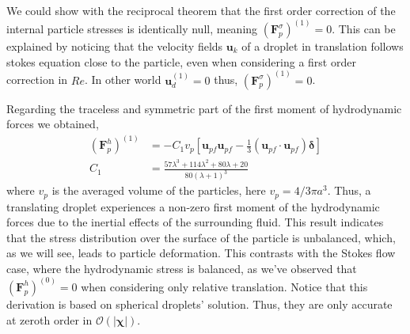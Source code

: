 We could show with the reciprocal theorem that the first order correction of the internal particle stresses is identically null, meaning $(\textbf{F}^\sigma_p)^{(1)} = 0$. 
This can be explained by noticing that the velocity fields $\textbf{u}_k$ of a droplet in translation follows stokes equation close to the particle, even when considering a first order correction in $Re$.
In other world $\textbf{u}^{(1)}_d =0 $ thus,  $(\textbf{F}^\sigma_p)^{(1)} = 0$. 

Regarding the traceless and symmetric part of the first moment of hydrodynamic forces we obtained, 
\begin{align}
    (\textbf{F}^h_p)^{(1)}  
    &=
    - C_1 v_p
    [
        \textbf{u}_{pf}\textbf{u}_{pf} - \frac{1}{3}(\textbf{u}_{pf}\cdot \textbf{u}_{pf})\bm\delta 
    ]\\
    C_1 &=
    \frac{57 \lambda^{3} + 114 \lambda^{2} + 80 \lambda + 20}{80 \left(\lambda + 1\right)^{3}}
    \label{eq:closure_sigma_e}
\end{align}
where $v_p$ is the averaged volume of the particles, here $v_p = 4/3 \pi a^3$.  
Thus, a translating droplet experiences a non-zero first moment of the hydrodynamic forces due to the inertial effects of the surrounding fluid. This result indicates that the stress distribution over the surface of the particle is unbalanced, which, as we will see, leads to particle deformation.
This contrasts with the Stokes flow case, where the hydrodynamic stress is balanced, as we've observed that $(\textbf{F}^h_p)^{(0)} = 0$ when considering only relative translation.  
Notice that this derivation is based on spherical droplets' solution. 
Thus, they are only accurate at zeroth order in  $\mathcal{O}(|\bm\chi|)$. 


